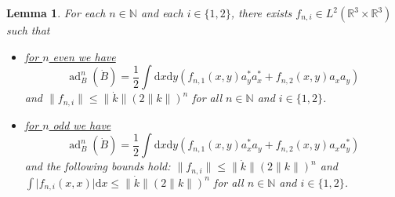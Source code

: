 \documentclass[11pt,a4paper,draft,DIV11]{scrartcl}	%
\newtheorem{lem}[thm]{Lemma}
\newcommand{\ad}{\operatorname{ad}}	%
\newcommand{\di}{\textrm{d}}		%
\newcommand{\Rbb}{\mathbb{R}}		%
\newcommand{\Nbb}{\mathbb{N}}		%
\newcommand{\norm}[1]{\lVert#1\rVert}	%
\newcommand{\bd}{\begin{displaymath}}			%
\newcommand{\ed}{\end{displaymath}}
\begin{document}
\begin{lem}
\label{lm:highercommutators}
 For each $n \in \Nbb$ and each $i \in \{1,2\}$, there exists $f_{n,i} \in L^2(\Rbb^3 \times \Rbb^3)$ such that
\begin{itemize}
 \item \underline{for $n$ even we have}
\bd
\ad^n_B(\dot B) = \frac{1}{2} \int \di x\di y\left( f_{n,1}(x,y) a^\ast_y a^\ast_x + f_{n,2}(x,y) a_x a_y \right)
\ed
and $\norm{f_{n,i}} \leq \norm{\dot k} (2\norm{k})^n$ for all $n \in \Nbb$ and $i \in \{1,2\}$. 
 \item \underline{for $n$ odd we have}
\bd
\ad^n_B(\dot B) = \frac{1}{2} \int \di x\di y\left( f_{n,1}(x,y) a^\ast_x a_y + f_{n,2}(x,y) a_x a^\ast_y \right)
\ed
and the following bounds hold: $\norm{f_{n,i}} \leq \norm{\dot k} (2\norm{k})^n$ and $\int \lvert f_{n,i}(x,x)\rvert \di x \leq \norm{\dot k} (2\norm{k})^n$ for all $n \in \Nbb$ and $i \in \{1,2\}$. 
\end{itemize}
\end{lem}
\end{document}
